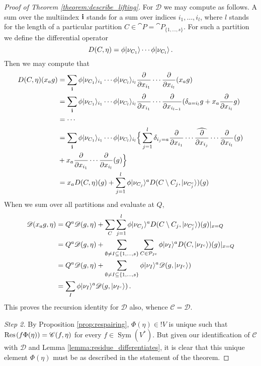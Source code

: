 \documentclass[english,letter paper,12pt,reqno]{article}
\DeclarePairedDelimiter\ket{\lvert}{\rangle}
\theoremstyle{example}
\numberwithin{equation}{section}
\DeclareMathOperator{\Sym}{Sym}
\begin{document}
\begin{proof}[Proof of Theorem \ref{theorem:describe_lifting}]
For $\mathscr{D}$ we may compute as follows. A sum over the multiindex $\bold{i}$ stands for a sum over indices $i_1,\ldots,i_l$, where $l$ stands for the length of a particular partition $C \in \cat{P} = \cat{P}_{\{1,\ldots,s\}}$. For such a partition we define the differential operator
\[
D( C, \eta ) = \phi\ket{\nu_{C_1}} \cdots \phi\ket{ \nu_{C_l} }\,.
\]
Then we may compute that
\begin{align*}
D( C, \eta )( x_a g ) &= \sum_{\bold{i}} \phi\ket{\nu_{C_1}}_{i_1} \cdots \phi\ket{\nu_{C_l}}_{i_l} \frac{\partial}{\partial x_{i_1}} \cdots \frac{\partial}{\partial x_{i_l}}( x_a g )\\
&= \sum_{\bold{i}} \phi\ket{\nu_{C_1}}_{i_1} \cdots \phi\ket{\nu_{C_l}}_{i_l} \frac{\partial}{\partial x_{i_1}} \cdots \frac{\partial}{\partial x_{i_{l-1}}}( \delta_{a = i_l} g + x_a \frac{\partial}{\partial x_{i_l}} g )\\
&= \cdots\\
&= \sum_{\bold{i}} \phi\ket{\nu_{C_1}}_{i_1} \cdots \phi\ket{\nu_{C_l}}_{i_l} \Big\{ \sum_{j=1}^l \delta_{i_j = a}  \frac{\partial}{\partial x_{i_1}} \cdots \widehat{ \frac{\partial}{\partial x_{i_j}}} \cdots \frac{\partial}{\partial x_{i_l}}(g)\\
&+ x_a \frac{\partial}{\partial x_{i_1}} \cdots \frac{\partial}{\partial x_{i_l}}(g) \Big\}\\
&= x_a D( C, \eta )(g) + \sum_{j=1}^l \phi \ket{\nu_{C_j}}^a D( C \setminus C_j, \ket{\nu_{C_j^c}} )(g)
\end{align*}
When we sum over all partitions and evaluate at $Q$,
\begin{align*}
\mathscr{D}( x_a g, \eta ) &= Q^a \mathscr{D}( g, \eta ) + \sum_C \sum_{j=1}^l \phi \ket{\nu_{C_j}}^a D( C \setminus C_j, \ket{\nu_{C_j^c}})(g)|_{x = Q}\\
&= Q^a \mathscr{D}( g, \eta ) + \sum_{\emptyset \neq I \subseteq \{1,\ldots,s\}} \sum_{C \in \cat{P}_{I^c}} \phi\ket{\nu_I}^a D( C, \ket{\nu_{I^c}} )(g)|_{x = Q}\\
&= Q^a \mathscr{D}( g, \eta ) + \sum_{\emptyset \neq I \subseteq \{1,\ldots,s\}} \phi \ket{\nu_I}^a \mathscr{D}(g, \ket{\nu_{I^c}})\\
&= \sum_I \phi\ket{\nu_I}^a \mathscr{D}(g, \ket{\nu_{I^c}})\,.
\end{align*}
This proves the recursion identity for $\mathscr{D}$ also, whence $\mathscr{C} = \mathscr{D}$.

\emph{Step 2.} By Proposition \ref{prop:respairing}, $\Phi( \eta ) \in {!}V$ is unique such that $\operatorname{Res}\!\;( f \Phi( \eta ) ) = \mathscr{C}(f, \eta)$ for every $f \in \Sym(V^*)$. But given our identification of $\mathscr{C}$ with $\mathscr{D}$ and Lemma \ref{lemma:residue_differentiates}, it is clear that this unique element $\Phi( \eta )$ must be as described in the statement of the theorem.
\end{proof}
\end{document}
